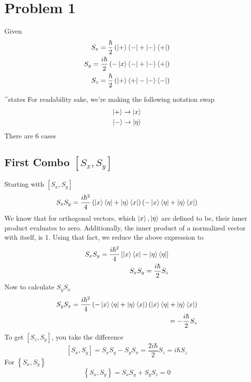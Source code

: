 \documentclass[]{article}
\begin{document}

\hypertarget{problem-1}{%
\section{Problem 1}\label{problem-1}}

Given \[
\begin{align}
S_{x} = \frac{\hbar}{2}\left( \ket{+} \bra{-}+\ket{-} \bra{+}   \right)  \\
S_{y} = \frac{i\hbar}{2}\left(- \ket{x} \bra{-} +\ket{-} \bra{+}  \right)  \\
S_{z} = \frac{\hbar}{2}\left( \ket{+} \bra{+} -\ket{-} \bra{-}   \right) 
\end{align}
\]

\^{}states For readability sake, we're making the following notation
swap \[
\begin{align}
\ket{+} \to \ket{x}  \\
\ket{-}  \to \ket{\eta} 
\end{align}
\] There are 6 cases

\hypertarget{first-combo-s_xs_y}{%
\subsection{\texorpdfstring{First Combo
\([S_{x},S_{y}]\)}{First Combo {[}S\_\{x\},S\_\{y\}{]}}}\label{first-combo-s_xs_y}}

Starting with \(\left[ S_{x},S_{y} \right]\) \[
S_{x}S_{y} = \frac{i\hbar^{2}}{4}\left( \ket{x} \bra{\eta} +\ket{\eta} \bra{x}  \right) \left( -\ket{x} \bra{\eta} +\ket{\eta} \bra{x}  \right) 
\] We know that for orthogonal vectors, which \(\ket{x},\ket{\eta}\) are
defined to be, their inner product evaluates to zero. Additionally, the
inner product of a normalized vector with itself, is 1. Using that fact,
we reduce the above expression to \[
\begin{align}
S_{x}S_{y} = \frac{i\hbar^{2}}{4}\left[ \ket{x} \bra{x} -\ket{\eta} \bra{\eta}  \right]  \\
S_{x}S_{y} = \frac{i\hbar}{2}S_{z}
\end{align}
\] Now to calculate \(S_{y}S_{x}\) \[
\begin{align}
S_{y}S_{x} = \frac{i\hbar^2}{4} \left( -\ket{x} \bra{\eta} +\ket{\eta} \bra{x}  \right) \left( \ket{x} \bra{\eta} +\ket{\eta} \bra{x}  \right)  \\
= -\frac{i\hbar}{2}S_{z}
\end{align}
\] To get \(\left[ S_{z},S_{y} \right]\), you take the difference \[
\left[ S_{x},S_{y} \right] = S_{x}S_{y}-S_{y}S_{x} = \frac{2i\hbar}{2}S_{z} = i\hbar S_{z}
\] For \(\left\{ S_{x},S_{y} \right\}\) \[
\left\{ S_{x},S_{y} \right\}  = S_{x}S_{y} +S_{y}S_{z} = 0
\]
\end{document}
